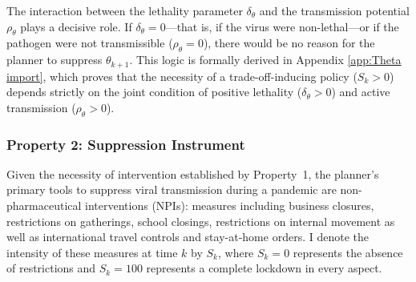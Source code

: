\documentclass[12pt, a4paper]{article}
\newcommand{\Sk}{S_k}
\begin{document}
The interaction between the lethality parameter $\delta_\theta$ and the transmission potential $\rho_\theta$ plays a decisive role. If $\delta_\theta = 0$---that is, if the virus were non-lethal---or if the pathogen were not transmissible ($\rho_\theta = 0$), there would be no reason for the planner to suppress $\theta_{k+1}$. This logic is formally derived in Appendix \ref{app:Theta import}, which proves that the necessity of a trade-off-inducing policy ($S_k > 0$) depends strictly on the joint condition of positive lethality ($\delta_\theta > 0$) and active transmission ($\rho_\theta > 0$). 



\subsubsection*{Property 2: Suppression Instrument}
Given the necessity of intervention established by Property~1, the planner's primary tools to suppress viral transmission during a pandemic are non-pharmaceutical interventions (NPIs): measures including business closures, restrictions on gatherings, school closings, restrictions on internal movement as well as international travel controls and stay-at-home orders. I denote the intensity of these measures at time $k$ by $\Sk$, where $\Sk = 0$ represents the absence of restrictions and $\Sk = 100$ represents a complete lockdown in every aspect. 
\end{document}
